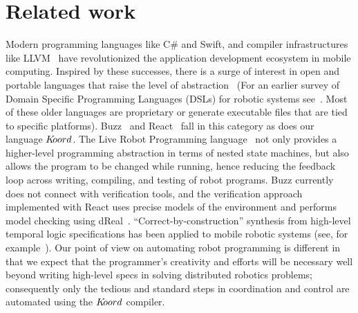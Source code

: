     
    \section{Related work}
    \label{sec:related}
    Modern programming languages like C\# and Swift, and   compiler infrastructures like LLVM~\cite{llvm} have revolutionized the application development ecosystem in mobile computing.
Inspired by these successes, there is a surge of interest in open and portable languages that raise the level of abstraction~\cite{Buzzlanguage,Bohrer:2018:VVC:3192366.3192406,reactlang,williams2003model} (For an earlier survey of Domain Specific Programming Languages (DSLs) for robotic systems see~\cite{Nordmann2014}. Most of these older languages are proprietary or generate executable files that are tied to specific platforms). 
%
Buzz~\cite{Buzzlanguage} and React~\cite{reactlang} fall in this category as does our language $K\kern-2pt oord$. 
The Live Robot Programming language~\cite{campusanofabry:lrp2016} not only provides a higher-level programming abstraction in terms of nested state machines, but also allows the program to be changed while running, hence reducing the feedback loop across writing, compiling, and testing of robot programs. 
Buzz currently does not  connect with  verification tools, and the verification approach implemented with React uses precise models of the environment and performs model checking using dReal~\cite{Gao2013}. 
%
%
%
%
``Correct-by-construction'' synthesis from high-level temporal logic specifications has been applied to mobile robotic systems (see, for example~\cite{kress2009temporal,kloetzer2008fully,wongpiromsarn2010receding,wongpiromsarn2011tulip,ulusoy2013optimality}).
Our point of view on automating robot programming is different in that we expect that the programmer's creativity and efforts will be necessary well beyond writing high-level specs in solving distributed robotics problems; consequently only the tedious and standard steps in coordination and control are automated using the $K\kern-2pt oord$ compiler.

